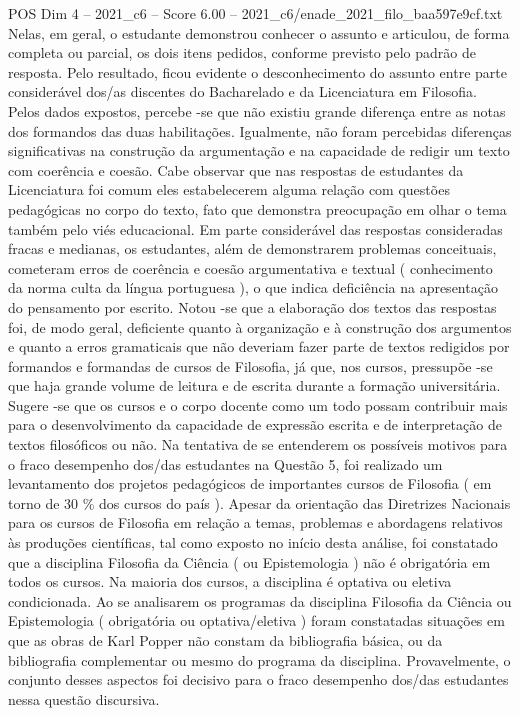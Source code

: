 \begin{textsample}{POS Dim 4 – 2021\_c6 – Score 6.00 – 2021\_c6/enade\_2021\_filo\_baa597e9cf.txt}
Nelas, em geral, o estudante demonstrou conhecer o assunto e articulou, de forma completa ou parcial, os dois itens pedidos, conforme previsto pelo padrão de resposta.
Pelo resultado, ficou evidente o desconhecimento do assunto entre parte considerável dos/as discentes do Bacharelado e da Licenciatura em Filosofia.
Pelos dados expostos, percebe -se que não existiu grande diferença entre as notas dos formandos das duas habilitações.
Igualmente, não foram percebidas diferenças significativas na construção da argumentação e na capacidade de redigir um texto com coerência e coesão.
Cabe observar que nas respostas de estudantes da Licenciatura foi comum eles estabelecerem alguma relação com questões pedagógicas no corpo do texto, fato que demonstra preocupação em olhar o tema também pelo viés educacional.
Em parte considerável das respostas consideradas fracas e medianas, os estudantes, além de demonstrarem problemas conceituais, cometeram erros de coerência e coesão argumentativa e textual ( conhecimento da norma culta da língua portuguesa ), o que indica deficiência na apresentação do pensamento por escrito.
Notou -se que a elaboração dos textos das respostas foi, de modo geral, deficiente quanto à organização e à construção dos argumentos e quanto a erros gramaticais que não deveriam fazer parte de textos redigidos por formandos e formandas de cursos de Filosofia, já que, nos cursos, pressupõe -se que haja grande volume de leitura e de escrita durante a formação universitária.
Sugere -se que os cursos e o corpo docente como um todo possam contribuir mais para o desenvolvimento da capacidade de expressão escrita e de interpretação de textos filosóficos ou não.
Na tentativa de se entenderem os possíveis motivos para o fraco desempenho dos/das estudantes na Questão 5, foi realizado um levantamento dos projetos pedagógicos de importantes cursos de Filosofia ( em torno de 30 \% dos cursos do país ).
Apesar da orientação das Diretrizes Nacionais para os cursos de Filosofia em relação a temas, problemas e abordagens relativos às produções científicas, tal como exposto no início desta análise, foi constatado que a disciplina Filosofia da Ciência ( ou Epistemologia ) não é obrigatória em todos os cursos.
Na maioria dos cursos, a disciplina é optativa ou eletiva condicionada.
Ao se analisarem os programas da disciplina Filosofia da Ciência ou Epistemologia ( obrigatória ou optativa/eletiva ) foram constatadas situações em que as obras de Karl Popper não constam da bibliografia básica, ou da bibliografia complementar ou mesmo do programa da disciplina.
Provavelmente, o conjunto desses aspectos foi decisivo para o fraco desempenho dos/das estudantes nessa questão discursiva.

\end{textsample}
